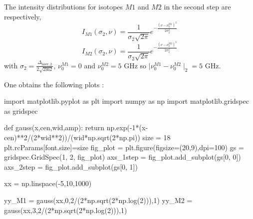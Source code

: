 \documentclass[
  a4paperpaper,
]{article}
\newenvironment{Shaded}{}{}
\newcommand{\ControlFlowTok}[1]{\textcolor[rgb]{0.84,0.23,0.29}{#1}}
\newcommand{\DecValTok}[1]{\textcolor[rgb]{0.00,0.36,0.77}{#1}}
\newcommand{\ImportTok}[1]{\textcolor[rgb]{0.01,0.18,0.38}{#1}}
\newcommand{\KeywordTok}[1]{\textcolor[rgb]{0.84,0.23,0.29}{#1}}
\newcommand{\NormalTok}[1]{\textcolor[rgb]{0.14,0.16,0.18}{#1}}
\newcommand{\OperatorTok}[1]{\textcolor[rgb]{0.14,0.16,0.18}{#1}}
\newcommand{\StringTok}[1]{\textcolor[rgb]{0.01,0.18,0.38}{#1}}
\begin{document}
The intensity distributions for isotopes \(M1\) and \(M2\) in the second
step are respectively, \[ 
I_{M1}(\sigma_2,\nu)=\frac{1}{\sigma_2\sqrt{2\pi}}e^{-\frac{(\nu-\nu_0^{M1})^2}{2\sigma_2^2}}
\] \[
I_{M2}(\sigma_2,\nu)=\frac{1}{\sigma_2\sqrt{2\pi}}e^{-\frac{(\nu-\nu_0^{M2})^2}{2\sigma_2^2}}
\] with
\(\sigma_2=\frac{\Delta_{\text{laser},2}}{2\sqrt{2\text{ln}2}}\),
\(\nu_0^{M1}=0\) and \(\nu_0^{M2}=5\) GHz so
\(\mid \nu_0^{M1}-\nu_0^{M2} \mid_2=5\) GHz.

One obtains the following plots :

\begin{Shaded}
\begin{Highlighting}[]
\ImportTok{import}\NormalTok{ matplotlib.pyplot }\ImportTok{as}\NormalTok{ plt}
\ImportTok{import}\NormalTok{ numpy }\ImportTok{as}\NormalTok{ np}
\ImportTok{import}\NormalTok{ matplotlib.gridspec }\ImportTok{as}\NormalTok{ gridspec}

\KeywordTok{def}\NormalTok{ gauss(x,cen,wid,amp):}
    \ControlFlowTok{return}\NormalTok{ np.exp(}\OperatorTok{{-}}\DecValTok{1}\OperatorTok{*}\NormalTok{(x}\OperatorTok{{-}}\NormalTok{cen)}\OperatorTok{**}\DecValTok{2}\OperatorTok{/}\NormalTok{(}\DecValTok{2}\OperatorTok{*}\NormalTok{wid}\OperatorTok{**}\DecValTok{2}\NormalTok{))}\OperatorTok{/}\NormalTok{(wid}\OperatorTok{*}\NormalTok{np.sqrt(}\DecValTok{2}\OperatorTok{*}\NormalTok{np.pi))}
\NormalTok{size }\OperatorTok{=} \DecValTok{18}
\NormalTok{plt.rcParams[}\StringTok{\textquotesingle{}font.size\textquotesingle{}}\NormalTok{]}\OperatorTok{=}\NormalTok{size}
\NormalTok{fig\_plot }\OperatorTok{=}\NormalTok{ plt.figure(figsize}\OperatorTok{=}\NormalTok{(}\DecValTok{20}\NormalTok{,}\DecValTok{9}\NormalTok{),dpi}\OperatorTok{=}\DecValTok{100}\NormalTok{)}
\NormalTok{gs }\OperatorTok{=}\NormalTok{ gridspec.GridSpec(}\DecValTok{1}\NormalTok{, }\DecValTok{2}\NormalTok{, fig\_plot)}
\NormalTok{axs\_1step }\OperatorTok{=}\NormalTok{ fig\_plot.add\_subplot(gs[}\DecValTok{0}\NormalTok{, }\DecValTok{0}\NormalTok{])}
\NormalTok{axs\_2step }\OperatorTok{=}\NormalTok{ fig\_plot.add\_subplot(gs[}\DecValTok{0}\NormalTok{, }\DecValTok{1}\NormalTok{])}

\NormalTok{xx }\OperatorTok{=}\NormalTok{ np.linspace(}\OperatorTok{{-}}\DecValTok{5}\NormalTok{,}\DecValTok{10}\NormalTok{,}\DecValTok{1000}\NormalTok{)}

\NormalTok{yy\_M1 }\OperatorTok{=}\NormalTok{ gauss(xx,}\DecValTok{0}\NormalTok{,}\DecValTok{2}\OperatorTok{/}\NormalTok{(}\DecValTok{2}\OperatorTok{*}\NormalTok{np.sqrt(}\DecValTok{2}\OperatorTok{*}\NormalTok{np.log(}\DecValTok{2}\NormalTok{))),}\DecValTok{1}\NormalTok{)}
\NormalTok{yy\_M2 }\OperatorTok{=}\NormalTok{ gauss(xx,}\DecValTok{3}\NormalTok{,}\DecValTok{2}\OperatorTok{/}\NormalTok{(}\DecValTok{2}\OperatorTok{*}\NormalTok{np.sqrt(}\DecValTok{2}\OperatorTok{*}\NormalTok{np.log(}\DecValTok{2}\NormalTok{))),}\DecValTok{1}\NormalTok{)}


\end{Highlighting}
\end{Shaded}
\end{document}

